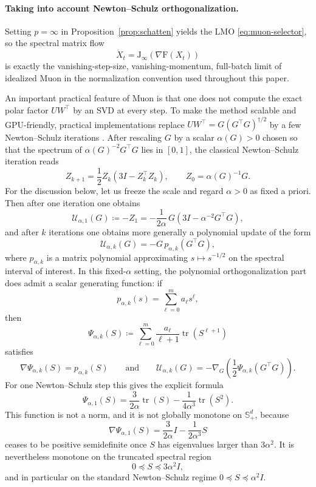 \documentclass{article}
\newcommand{\mF}{\mathrm{F}}
\newcommand{\mJ}{\mathrm{J}}
\newcommand{\tr}{\operatorname{tr}}
\begin{document}
\paragraph{Taking into account Newton--Schulz orthogonalization.}
Setting $p=\infty$ in Proposition~\ref{prop:schatten} yields the LMO \eqref{eq:muon-selector}, so the spectral matrix flow
$$
\dot X_t=\mJ_\infty(\nabla \mF(X_t))
$$
is exactly the vanishing-step-size, vanishing-momentum, full-batch limit of idealized Muon in the normalization convention used throughout this paper.

An important practical feature of Muon is that one does not compute the exact polar factor $UW^\top$ by an SVD at every step. To make the method scalable and GPU-friendly, practical implementations replace $UW^\top = G(G^\top G)^{\dagger/2}$ by a few Newton--Schulz iterations \citep{KellerJordan2024,LiuSuYaoEtAl2025}. After rescaling $G$ by a scalar $\alpha(G)>0$ chosen so that the spectrum of $\alpha(G)^{-2}G^\top G$ lies in $[0,1]$, the classical Newton--Schulz iteration reads
$$
Z_{k+1}
=
\frac12 Z_k(3I-Z_k^\top Z_k),
\qquad
Z_0=\alpha(G)^{-1}G.
$$
For the discussion below, let us freeze the scale and regard $\alpha>0$ as fixed a priori. Then after one iteration one obtains
$$
\mathcal U_{\alpha,1}(G)
\coloneqq
-Z_1
=
-\frac{1}{2\alpha}
\,G\left(3I-\alpha^{-2}G^\top G\right),
$$
and after $k$ iterations one obtains more generally a polynomial update of the
form
$$
\mathcal U_{\alpha,k}(G)
=
-G\,p_{\alpha,k}\!\left(G^\top G\right),
$$
where $p_{\alpha,k}$ is a matrix polynomial approximating $s\mapsto s^{-1/2}$ on the spectral interval of interest. In this fixed-$\alpha$ setting, the polynomial orthogonalization part does admit a scalar generating function: if
$$
p_{\alpha,k}(s)=\sum_{\ell=0}^m a_\ell s^\ell,
$$
then
$$
\Psi_{\alpha,k}(S)\coloneqq \sum_{\ell=0}^m \frac{a_\ell}{\ell+1}\tr(S^{\ell+1})
$$
satisfies
$$
\nabla \Psi_{\alpha,k}(S)=p_{\alpha,k}(S)
\qquad\text{and}\qquad
\mathcal U_{\alpha,k}(G)
=
-\nabla_G\!\left(\frac12 \Psi_{\alpha,k}(G^\top G)\right).
$$
For one Newton--Schulz step this gives the explicit formula
$$
\Psi_{\alpha,1}(S)
=
\frac{3}{2\alpha}\tr(S)-\frac{1}{4\alpha^3}\tr(S^2).
$$
This function is not a norm, and it is not globally monotone on $\mathbb S_+^d$, because
$$
\nabla \Psi_{\alpha,1}(S)=\frac{3}{2\alpha}I-\frac{1}{2\alpha^3}S
$$
ceases to be positive semidefinite once $S$ has eigenvalues larger than $3\alpha^2$. It is nevertheless monotone on the truncated spectral region
$$
0\preceq S\preceq 3\alpha^2 I,
$$
and in particular on the standard Newton--Schulz regime $0\preceq S\preceq \alpha^2 I$.
\end{document}
